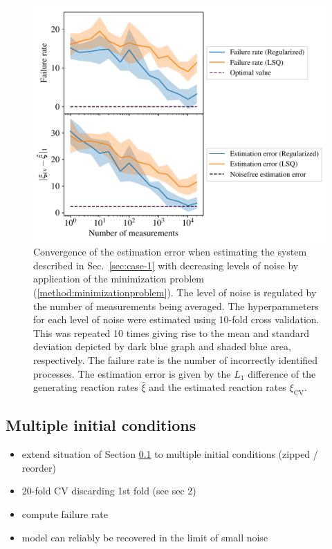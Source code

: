 \documentclass[oneside, abstracton, titlepage]{scrartcl}
\begin{document}
	\begin{figure}
		\centering
		\includegraphics[width=.7\columnwidth]{./figures_tex/case2}
		\caption{Convergence of the estimation error when estimating the system described in Sec.~\ref{sec:case-1} with decreasing levels of noise by application of the minimization problem (\ref{method:minimizationproblem}). The level of noise is regulated by the number of measurements being averaged. The hyperparameters for each level of noise were estimated using 10-fold cross validation. This was repeated 10 times giving rise to the mean and standard deviation depicted by dark blue graph and shaded blue area, respectively. The failure rate is the number of incorrectly identified processes. The estimation error is given by the $L_1$ difference of the generating reaction rates $\hat{\xi}$ and the estimated reaction rates $\xi_\mathrm{CV}$.}
		\label{fig:case2-convergence}
	\end{figure}

	\subsection{Multiple initial conditions}\label{sec:case-3}
	
	\begin{itemize}
		\item extend situation of Section \ref{sec:case-3} to multiple initial conditions (zipped / reorder)
		\item $20$-fold CV discarding 1st fold (see sec 2)
		\item compute failure rate
		\item model can reliably be recovered in the limit of small noise
	\end{itemize}
\end{document}
